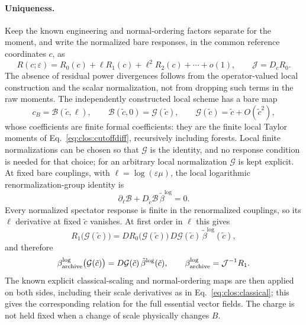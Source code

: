 \documentclass[11pt,a4paper]{article}
\numberwithin{equation}{section}
\begin{document}
\paragraph{Uniqueness.} Keep the known engineering and normal-ordering factors separate for the moment, and write the
normalized bare responses, in the common reference coordinates $c$, as
\begin{equation}
 R(c;\varepsilon)=R_0(c)+\ell R_1(c)+\ell^2R_2(c)+\cdots+o(1),\qquad \mathcal J=D_cR_0 .
 \label{eq:clos:Rexp}
\end{equation}
The absence of residual power divergences follows from the operator-valued local construction and the scalar
normalization, not from dropping such terms in the raw moments. The independently constructed local scheme has a bare
map
\begin{equation}
 c_B=\mathcal B(\tilde c,\ell),\qquad \mathcal B(\tilde c,0)=\mathcal G(\tilde c),\qquad
 \mathcal G(\tilde c)=\tilde c+O(\tilde c^2),
\end{equation}
whose coefficients are finite formal coefficients: they are the finite local Taylor moments of
Eq.~\eqref{eq:clos:cutoffdiff}, recursively including forests. Local finite normalizations can be chosen so that
$\mathcal G$ is the identity, and no response condition is needed for that choice; for an arbitrary local normalization
$\mathcal G$ is kept explicit. At fixed bare couplings, with $\ell=\log(\varepsilon\mu)$, the local logarithmic
renormalization-group identity is
\begin{equation}
 \partial_\ell\mathcal B+D_{\tilde c}\mathcal B\,\tilde\beta^{\log}=0 .
\end{equation}
Every normalized spectator response is finite in the renormalized couplings, so its $\ell$ derivative at fixed
$\tilde c$ vanishes. At first order in $\ell$ this gives
\begin{equation}
 R_1\bigl(\mathcal G(\tilde c)\bigr)=DR_0\bigl(\mathcal G(\tilde c)\bigr)\,D\mathcal G(\tilde c)\,
 \tilde\beta^{\log}(\tilde c),
 \label{eq:clos:localtoR}
\end{equation}
and therefore
\begin{equation}
 \beta^{\log}_{\rm archive}\bigl(\mathcal G(\tilde c)\bigr)=D\mathcal G(\tilde c)\,\tilde\beta^{\log}(\tilde c),
 \qquad \beta^{\log}_{\rm archive}=\mathcal J^{-1}R_1 .
 \label{eq:clos:equivalence}
\end{equation}
The known explicit classical-scaling and normal-ordering maps are then applied on both sides, including their scale
derivatives as in Eq.~\eqref{eq:clos:classical}; this gives the corresponding relation for the full essential vector
fields. The charge is not held fixed when a change of scale physically changes $B$.
\end{document}
